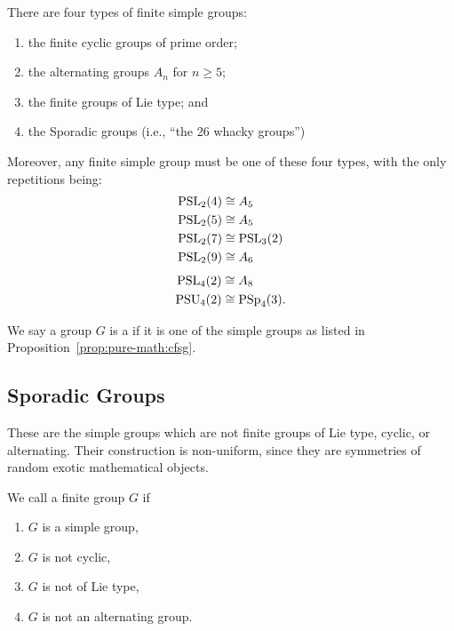 \begin{proposition}\label{prop:pure-math:cfsg}
There are four types of finite simple groups:
\begin{enumerate}
\item the finite cyclic groups of prime order;
\item the alternating groups $A_{n}$ for $n\geq 5$;
\item the finite groups of Lie type; and
\item the Sporadic groups (i.e., ``the 26 whacky groups'')
\end{enumerate}
Moreover, any finite simple group must be one of these four types, with
the only repetitions being:
\begin{subequations}
  \begin{align}
    \mathrm{PSL}_{2}(4)&\cong A_{5}\\
    \mathrm{PSL}_{2}(5)&\cong A_{5}\\
    \mathrm{PSL}_{2}(7)&\cong\mathrm{PSL}_{3}(2)\\
    \mathrm{PSL}_{2}(9)&\cong A_{6}
  \end{align}
\end{subequations}\belowdisplayskip{}\abovedisplayskip
  \begin{align}
    \mathrm{PSL}_{4}(2)&\cong A_{8}\\
    \mathrm{PSU}_{4}(2)&\cong\mathrm{PSp}_{4}(3).
  \end{align}
\end{proposition}

\begin{definition}
We say a group $G$ is a  if it is one of the
simple groups as listed in Proposition~\ref{prop:pure-math:cfsg}.
\end{definition}

\subsection{Sporadic Groups}
These are the simple groups which are not finite groups of Lie type,
cyclic, or alternating. Their construction is non-uniform, since they
are symmetries of random exotic mathematical objects.

\begin{definition}
  We call a finite group $G$  if
  \begin{enumerate}
  \item $G$ is a simple group,
  \item $G$ is not cyclic,
  \item $G$ is not of Lie type,
  \item $G$ is not an alternating group.
  \end{enumerate}
\end{definition}

